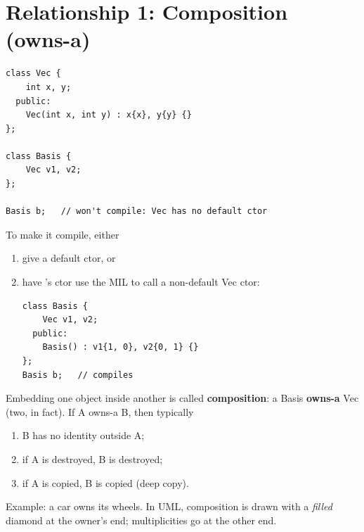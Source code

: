 \section{Relationship 1: Composition (owns-a)}
\begin{lstlisting}[style=cpp]
class Vec {
    int x, y;
  public:
    Vec(int x, int y) : x{x}, y{y} {}
};

class Basis {
    Vec v1, v2;
};

Basis b;   // won't compile: Vec has no default ctor
\end{lstlisting}
To make it compile, either
\begin{enumerate}
  \item give  a default ctor, or
  \item have 's ctor use the MIL to call a non-default Vec ctor:
\begin{lstlisting}[style=cpp]
class Basis {
    Vec v1, v2;
  public:
    Basis() : v1{1, 0}, v2{0, 1} {}
};
Basis b;   // compiles
\end{lstlisting}
\end{enumerate}

Embedding one object inside another is called \textbf{composition}: a Basis
\textbf{owns-a} Vec (two, in fact). If A owns-a B, then typically
\begin{enumerate}
  \item B has no identity outside A;
  \item if A is destroyed, B is destroyed;
  \item if A is copied, B is copied (deep copy).
\end{enumerate}
Example: a car owns its wheels. In UML, composition is drawn with a
\emph{filled} diamond at the owner's end; multiplicities go at the other end.

\begin{center}
\end{center}

